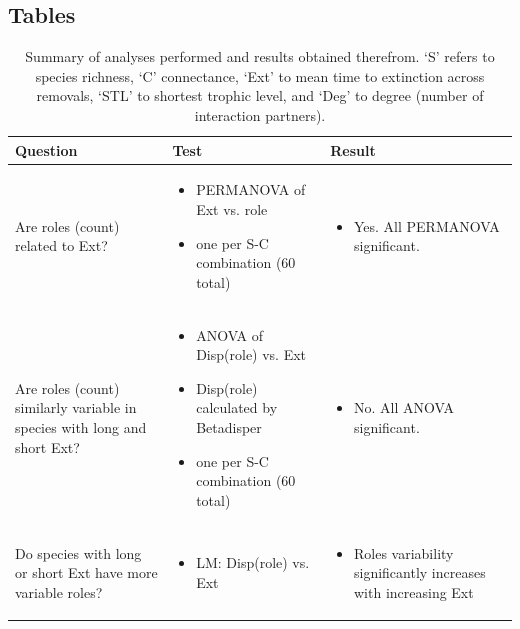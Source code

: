 \documentclass[12pt]{article}
\begin{document}
\begin{landscape}
\section*{Tables}

    \begin{table}[h!]
        \centering
        \caption{Summary of analyses performed and results obtained therefrom. `S' refers to species richness, `C' connectance, `Ext' to mean time to extinction across removals, `STL' to shortest trophic level, and `Deg' to degree (number of interaction partners).}
        \label{overview_table}
        \footnotesize
        \begin{tabular}{m{6.5cm}|m{7cm}|m{8cm}}
        Question & Test & Result \\
        \hline
        Are roles (count) related to Ext? & 
        \begin{itemize}
            \item PERMANOVA of Ext vs. role
            \item one per S-C combination (60 total)
        \end{itemize} 
        & \begin{itemize} \item Yes. All PERMANOVA significant. \end{itemize} \\
        Are roles (count) similarly variable in species with long and short Ext? & 
        \begin{itemize}
            \item ANOVA of Disp(role) vs. Ext
            \item Disp(role) calculated by Betadisper
            \item one per S-C combination (60 total)
        \end{itemize}
        & \begin{itemize} \item No. All ANOVA significant. \end{itemize} \\
        Do species with long or short Ext have more variable roles? & \begin{itemize}
            \item LM: Disp(role) vs. Ext
        \end{itemize} & \begin{itemize} \item Roles variability significantly increases with increasing Ext \end{itemize} \\

\end{tabular}
\end{table}
\end{landscape}
\end{document}
